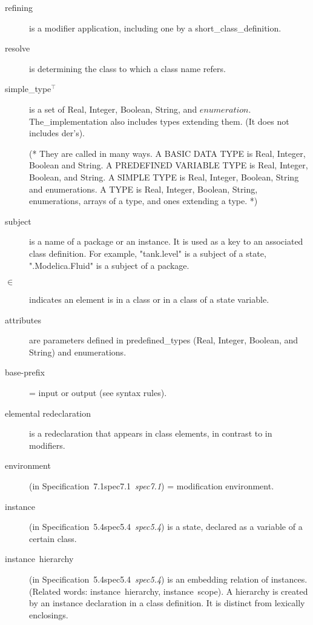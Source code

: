 \documentclass[10pt,b5paper]{article}
\def\specrefx#1#2{Specification~#1\ifx\relax#2\relax{}\else~{\it{}#2}\fi}
\def\specref#1{\specrefx{#1}{\csname spec#1\endcsname}}
\begin{document}
\begin{description}
\item [refining] is a modifier application, including one by a
short_class_definition.

\item [resolve] is determining the class to which a class name refers.

\item [simple_type{$\mbox{}^\top$}] is a set of {Real}, {Integer},
{Boolean}, {String}, and $\mathit{enumeration}$.  The_implementation
also includes types extending them.  (It does not includes der's).

(* They are called in many ways.  A BASIC DATA TYPE is Real, Integer,
Boolean and String.  A PREDEFINED VARIABLE TYPE is Real, Integer,
Boolean, and String.  A SIMPLE TYPE is Real, Integer, Boolean, String
and enumerations.  A TYPE is Real, Integer, Boolean, String,
enumerations, arrays of a type, and ones extending a type.  *)

\item [subject] is a name of a package or an instance.  It is used as
a key to an associated class definition.  For example, "tank.level" is
a subject of a state, ".Modelica.Fluid" is a subject of a package.

\item [$\in$] indicates an element is in a class or in a class of a
state variable.


\item [attributes] are parameters defined in predefined_types (Real,
Integer, Boolean, and String) and enumerations.

\item [base-prefix] = input or output (see syntax rules).

\item [elemental redeclaration] is a redeclaration that appears in
class elements, in contrast to in modifiers.

\item [environment] (in \specref{7.1}\/) = {modification environment}.

\item [instance] (in \specref{5.4}\/) is a state, declared as a
variable of a certain class.

\item [instance~hierarchy] (in \specref{5.4}\/) is an embedding
relation of instances.  (Related words: instance~hierarchy,
instance~scope).  A hierarchy is created by an instance declaration in
a class definition.  It is distinct from lexically enclosings.


\end{description}
\end{document}
